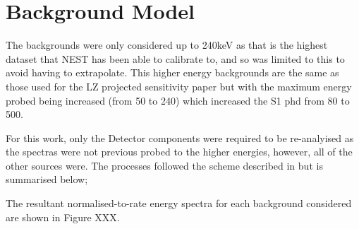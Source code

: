 \section{Background Model}
\par
The backgrounds were only considered up to 240keV as that is the highest dataset that NEST has been able to calibrate to, and so was limited to this to avoid having to extrapolate.
This higher energy backgrounds are the same as those used for the LZ projected sensitivity paper \cite{LZ_projected_sensitivity_paper_ref} but with the maximum energy probed being increased (from 50 to 240) which increased the S1 phd from 80 to 500.

\par
For this work, only the Detector components were required to be re-analyised as the spectras were not previous probed to the higher energies, however, all of the other sources were.
The processes followed the scheme described in \cite{LZ_projected_sensitivity_paper_ref} but is summarised below;



\par
The resultant normalised-to-rate energy spectra for each background considered are shown in Figure XXX.

